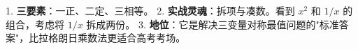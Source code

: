 \begin{summarybox}
1. \textbf{三要素}：一正、二定、三相等。
2. \textbf{实战灵魂}：拆项与凑数。看到 $x^2$ 和 $1/x$ 的组合，考虑将 $1/x$ 拆成两份。
3. \textbf{地位}：它是解决三变量对称最值问题的"标准答案"，比拉格朗日乘数法更适合高考考场。
\end{summarybox}
